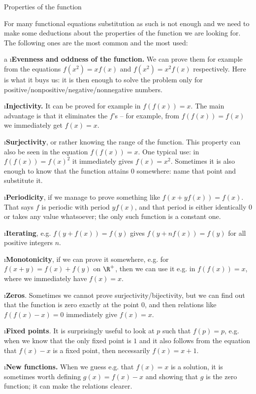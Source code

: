 \enditems

\sec Properties of the function

For many functional equations substitution as such is not enough and we need to make some deductions about the properties of the function we are looking for. The following ones are the most common and the most used:

\begitems \style a
\i \textbf{Evenness and oddness of the function.} We can prove them for example from the equations $f(x^2)=xf(x)$ and $f(x^2)=x^2f(x)$ respectively. Here is what it buys us: it is then enough to solve the problem only for positive/nonpositive/negative/nonnegative numbers.

\i \textbf{Injectivity.} It can be proved for example in $f(f(x))=x$. The main advantage is that it eliminates the $f$'s -- for example, from $f(f(x))=f(x)$ we immediately get $f(x)=x$.

\i \textbf{Surjectivity}, or rather knowing the range of the function. This property can also be seen in the equation $f(f(x))=x$. One typical use: in $f(f(x))=f(x)^2$ it immediately gives $f(x)=x^2$. Sometimes it is also enough to know that the function attains $0$ somewhere: name that point and substitute it.

\i \textbf{Periodicity}, if we manage to prove something like $f(x+yf(x))=f(x)$. That says $f$ is periodic with period $yf(x)$, and that period is either identically $0$ or takes any value whatsoever; the only such function is a constant one.

\i \textbf{Iterating}, e.g. $f(y+f(x))=f(y)$ gives $f(y+nf(x))=f(y)$ for all positive integers $n$.

\i \textbf{Monotonicity}, if we can prove it somewhere, e.g. for $f(x+y)=f(x)+f(y)$ on $\R^+$, then we can use it e.g. in $f(f(x))=x$, where we immediately have $f(x)=x$.

\i \textbf{Zeros}. Sometimes we cannot prove surjectivity/bijectivity, but we can find out that the function is zero exactly at the point $0$, and then relations like $f(f(x)-x)=0$ immediately give $f(x)=x$.

\i \textbf{Fixed points}. It is surprisingly useful to look at $p$ such that $f(p)=p$, e.g. when we know that the only fixed point is $1$ and it also follows from the equation that $f(x)-x$ is a fixed point, then necessarily $f(x)=x+1$.

\i \textbf{New functions.} When we guess e.g. that $f(x)=x$ is a solution, it is sometimes worth defining $g(x)=f(x)-x$ and showing that $g$ is the zero function; it can make the relations clearer.

